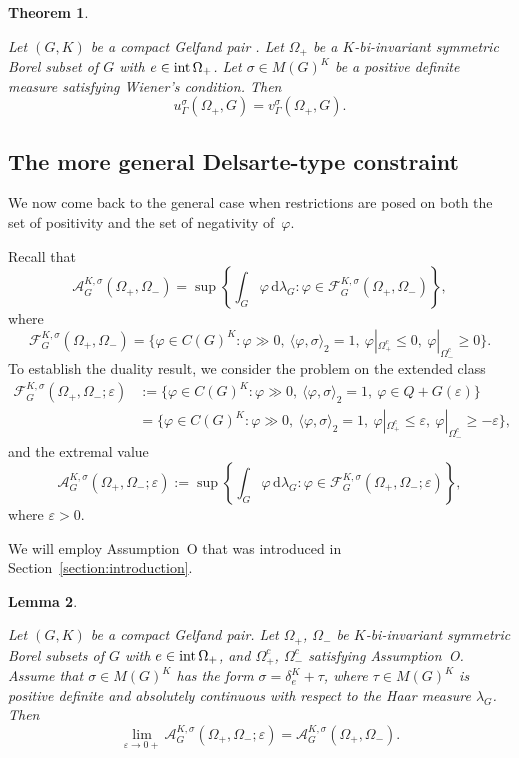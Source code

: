 \documentclass[[a4paper,english,12pt]{amsart}
\theoremstyle{plain}
\newtheorem{theorem}{Theorem}
\newtheorem{lemma}[theorem]{Lemma}
\theoremstyle{remark}
\newcommand{\intt}{\mbox{\rm int\,}}
\newcommand{\ff}{\varphi}
\begin{document}
\begin{theorem} \label{theorem:one-sided}

Let $(G,K)$ be a compact Gelfand pair . Let $\Omega_+$ be a $K$-bi-invariant symmetric Borel subset of $G$ with $e \in \intt{\Omega_+}$. Let $\sigma \in M(G)^K$ be a positive definite measure satisfying Wiener's condition. Then
$$
u_\Gamma^{\sigma}(\Omega_+, G) = v_\Gamma^{\sigma}(\Omega_+, G).
$$

\end{theorem}

\subsection{The more general Delsarte-type constraint}

We now come back to the general case when restrictions are posed on both the set of positivity and the set of negativity of~$\varphi$.

Recall that
$$
\mathcal{A}^{K,\sigma}_G(\Omega_+, \Omega_{-}) = \sup \left\{\int_G \varphi \, \mbox{d}\lambda_G : \varphi \in \mathcal{F}^{K,\sigma}_G(\Omega_+, \Omega_-)  \right\},
$$
where
$$
\mathcal{F}^{K,\sigma}_G(\Omega_+, \Omega_-) = \{ \varphi \in C(G)^K : \varphi  \gg 0, \ \langle \ff, \sigma \rangle_2 = 1, \  \varphi|_{\Omega_+^c} \le 0, \  \varphi|_{\Omega_-^c} \ge 0 \}.
$$
To establish the duality result, we consider the problem on the extended class
\begin{align*}
\mathcal{F}^{K,\sigma}_G(\Omega_+, \Omega_-; \varepsilon) & := \{ \varphi \in C(G)^K : \varphi  \gg 0, \ \langle \ff, \sigma \rangle_2 = 1, \  \varphi \in Q + G(\varepsilon) \} \\
& = \{ \varphi \in C(G)^K : \varphi  \gg 0, \ \langle \ff, \sigma \rangle_2 = 1, \  \varphi|_{\Omega_+^c} \le \varepsilon, \  \varphi|_{\Omega_-^c} \ge -\varepsilon \},
\end{align*}
and the extremal value 
$$
\mathcal{A}^{K,\sigma}_G(\Omega_+, \Omega_-;\varepsilon) := \sup\left\{\int_G \varphi \, \mbox{d}\lambda_G  : \varphi \in \mathcal{F}^{K,\sigma}_G(\Omega_+, \Omega_-; \varepsilon) \right\}, 
$$
where $\varepsilon > 0$. 

We will employ Assumption~O that was introduced in Section~\ref{section:introduction}.

\begin{lemma} \label{lemma:C_epsilon}

Let $(G,K)$ be a compact Gelfand pair. Let $\Omega_+$, $\Omega_-$ be $K$-bi-invariant symmetric Borel subsets of $G$ with $e \in \intt{\Omega_+}$, and  $\Omega_+^c$, $\Omega_-^c$ satisfying Assumption~O. 
Assume that $\sigma\in M(G)^K$ has the form $\sigma = \delta_e^K + \tau $, where \(\tau \in M(G)^K\) is positive definite and absolutely continuous with respect to the Haar measure $\lambda_G$.
Then
$$
\lim_{\varepsilon \to 0+} \mathcal{A}^{K,\sigma}_G(\Omega_+, \Omega_-;\varepsilon) = \mathcal{A}^{K,\sigma}_G(\Omega_+, \Omega_{-}).
$$

\end{lemma}
\end{document}
